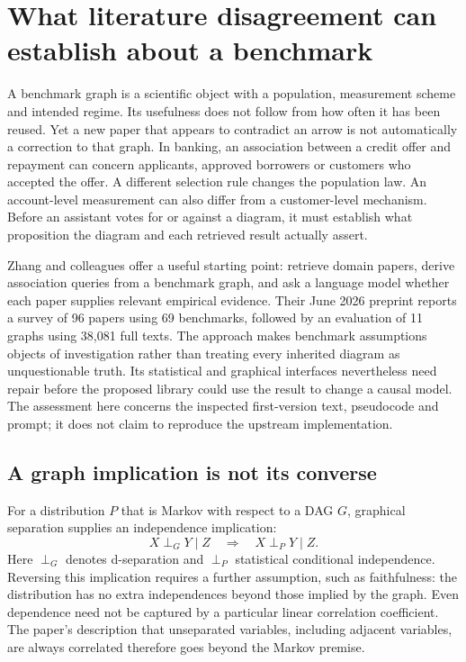 \section{What literature disagreement can establish about a benchmark}
\label{exec17:validity-development}

A benchmark graph is a scientific object with a population, measurement scheme
and intended regime. Its usefulness does not follow from how often it has been
reused. Yet a new paper that appears to contradict an arrow is not automatically
a correction to that graph. In banking, an association between a credit offer
and repayment can concern applicants, approved borrowers or customers who
accepted the offer. A different selection rule changes the population law.
An account-level measurement can also differ from a customer-level mechanism.
Before an assistant votes for or against a diagram, it must establish what
proposition the diagram and each retrieved result actually assert.

Zhang and colleagues offer a useful starting point: retrieve domain papers,
derive association queries from a benchmark graph, and ask a language model
whether each paper supplies relevant empirical evidence. Their June 2026
preprint reports a survey of 96 papers using 69 benchmarks, followed by an
evaluation of 11 graphs using 38,081 full texts. The approach makes benchmark
assumptions objects of investigation rather than treating every inherited
diagram as unquestionable truth. Its statistical and graphical interfaces
nevertheless need repair before the proposed library could use the result to
change a causal model. The assessment here concerns the inspected first-version
text, pseudocode and prompt; it does not claim to reproduce the upstream
implementation.\citep{exec17_benchmark_consistency}

\subsection{A graph implication is not its converse}

For a distribution $P$ that is Markov with respect to a DAG $G$, graphical
separation supplies an independence implication:
\begin{equation}
 X\perp_G Y\mid Z \quad\Longrightarrow\quad X\perp_P Y\mid Z.
\label{exec17:validity-markov}
\end{equation}
Here $\perp_G$ denotes d-separation and $\perp_P$ statistical conditional
independence. Reversing this implication requires a further assumption, such
as faithfulness: the distribution has no extra independences beyond those
implied by the graph. Even dependence need not be captured by a particular
linear correlation coefficient. The paper's description that unseparated
variables, including adjacent variables, are always correlated therefore goes
beyond the Markov premise.\citep{exec17_benchmark_consistency}

